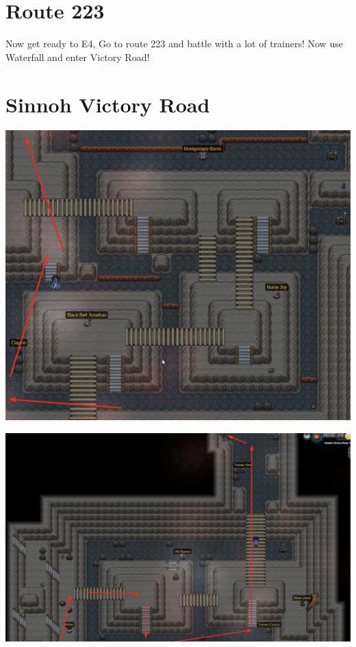\documentclass[11pt]{article}
\begin{document}
\section{Route 223}\label{sec:route-223}
Now get ready to E4, Go to route 223 and battle with a lot of trainers!
Now use Waterfall and enter Victory Road!




\section{Sinnoh Victory Road}\label{sec:sinnoh-victory-road}

\includegraphics[width=\textwidth]{walkthrough/Sinnoh/victory-road-1}

\includegraphics[width=\textwidth]{walkthrough/Sinnoh/victory-road-2}
\end{document}
